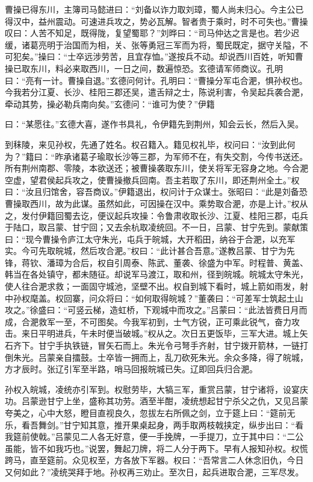 曹操已得东川，主簿司马懿进曰：“刘备以诈力取刘璋，蜀人尚未归心。今主公已得汉中，益州震动。可速进兵攻之，势必瓦解。智者贵于乘时，时不可失也。”曹操叹曰：人苦不知足，既得陇，复望蜀耶？”刘晔曰：“司马仲达之言是也。若少迟缓，诸葛亮明于治国而为相，关、张等勇冠三军而为将，蜀民既定，据守关隘，不可犯矣。”操曰：“士卒远涉劳苦，且宜存恤。”遂按兵不动。却说西川百姓，听知曹操已取东川，料必来取西川，一日之间，数遍惊恐。玄德请军师商议。孔明曰：“亮有一计。曹操自退。”玄德问何计。孔明曰：“曹操分军屯合淝，惧孙权也。今我若分江夏、长沙、桂阳三郡还吴，遣舌辩之士，陈说利害，令吴起兵袭合淝，牵动其势，操必勒兵南向矣。”玄德问：“谁可为使？”伊籍

曰：“某愿往。”玄德大喜，遂作书具礼，令伊籍先到荆州，知会云长，然后入吴。

到秣陵，来见孙权，先通了姓名。权召籍入。籍见权礼毕，权问曰：“汝到此何为？”籍曰：“昨承诸葛子瑜取长沙等三郡，为军师不在，有失交割，今传书送还。所有荆州南郡、零陵，本欲送还；被曹操袭取东川，使关将军无容身之地。今合淝空虚，望君侯起兵攻之，使曹操撤兵回南。吾主若取了东川，即还荆州全土。”权曰：“汝且归馆舍，容吾商议。”伊籍退出，权问计于众谋士。张昭曰：“此是刘备恐曹操取西川，故为此谋。虽然如此，可因操在汉中。乘势取合淝，亦是上计。”权从之，发付伊籍回蜀去讫，便议起兵攻操：令鲁肃收取长沙、江夏、桂阳三郡，屯兵于陆口，取吕蒙、甘宁回；又去余杭取凌统回。不一日，吕蒙、甘宁先到。蒙献策曰：“现今曹操令庐江太守朱光，屯兵于皖城，大开稻田，纳谷于合淝，以充军实。今可先取皖城，然后攻合淝。”权曰：“此计甚合吾意。”遂教吕蒙、甘宁为先锋，蒋钦、潘璋为合后，权自引周泰、陈武、董袭、徐盛为中军。时程普、黄盖、韩当在各处镇守，都未随征。却说军马渡江，取和州，径到皖城。皖城太守朱光，使人往合淝求救；一面固守城池，坚壁不出。权自到城下看时，城上箭如雨发，射中孙权麾盖。权回寨，问众将曰：“如何取得皖城？”董袭曰：“可差军士筑起土山攻之。”徐盛曰：“可竖云梯，造虹桥，下观城中而攻之。”吕蒙曰：“此法皆费日月而成，合淝救军一至，不可图矣。今我军初到，士气方锐，正可乘此锐气，奋力攻击。来日平明进兵，午未时便当破城。”权从之。次日五更饭毕，三军大进。城上矢石齐下。甘宁手执铁链，冒矢石而上。朱光令弓弩手齐射，甘宁拨开箭林，一链打倒朱光。吕蒙亲自擂鼓。士卒皆一拥而上，乱刀砍死朱光。余众多降，得了皖城，方才辰时。张辽引军至半路，哨马回报皖城已失。辽即回兵归合淝。

孙权入皖城，凌统亦引军到。权慰劳毕，大犒三军，重赏吕蒙，甘宁诸将，设宴庆功。吕蒙逊甘宁上坐，盛称其功劳。酒至半酣，凌统想起甘宁杀父之仇，又见吕蒙夸美之，心中大怒，瞪目直视良久，忽拔左右所佩之剑，立于筵上曰：“筵前无乐，看吾舞剑。”甘宁知其意，推开果桌起身，两手取两枝戟挟定，纵步出曰：“看我筵前使戟。”吕蒙见二人各无好意，便一手挽牌，一手提刀，立于其中曰：“二公虽能，皆不如我巧也。”说罢，舞起刀牌，将二人分于两下。早有人报知孙权。权慌跨马，直至筵前。众见权至，方各放下军器。权曰：“吾常言二人休念旧仇，今日又何如此？”凌统哭拜于地。孙权再三劝止。至次日，起兵进取合淝，三军尽发。


